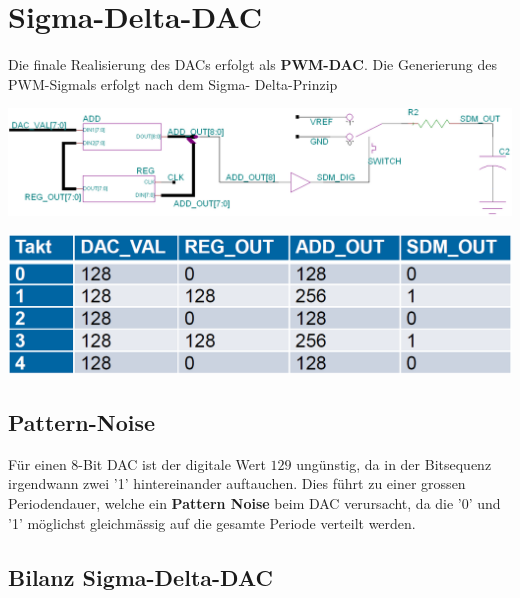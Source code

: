 \section{Sigma-Delta-DAC}

Die finale Realisierung des DACs erfolgt als \textbf{PWM-DAC}. Die Generierung des PWM-Sigmals erfolgt nach dem Sigma-
Delta-Prinzip

\begin{minipage}[t]{0.58\columnwidth}
    \includegraphics[width=\columnwidth]{images/sigma-delta_DAC.png}
\end{minipage}
\hfill
\begin{minipage}[t]{0.38\columnwidth}
    \includegraphics[width=\columnwidth]{images/sigma-delta_DAC_verlauf.png}
\end{minipage}

\subsection{Pattern-Noise}

Für einen 8-Bit DAC ist der digitale Wert $129$ ungünstig, da in der Bitsequenz irgendwann zwei '1' hintereinander auftauchen.
Dies führt zu einer grossen Periodendauer, welche ein \textbf{Pattern Noise} beim DAC verursacht, da die '0' und '1' möglichst
gleichmässig auf die gesamte Periode verteilt werden.


\subsection{Bilanz Sigma-Delta-DAC}

